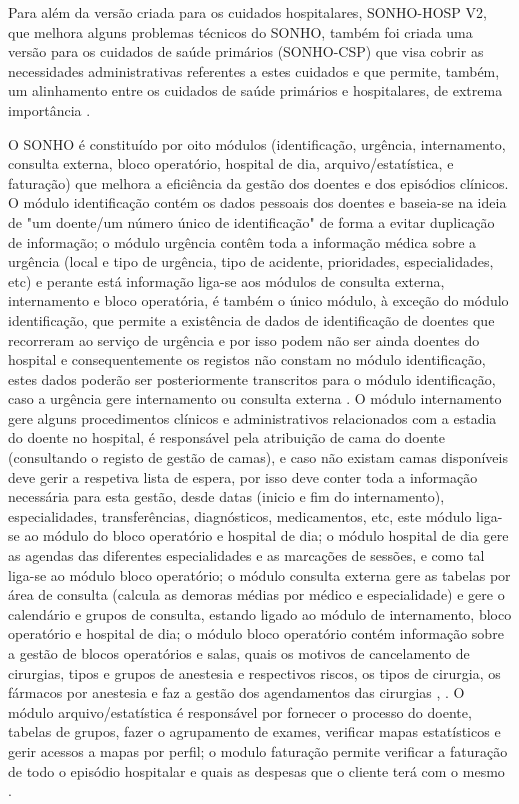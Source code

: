 \documentclass[conference]{IEEEtran}
\begin{document}
Para além da versão criada para os cuidados hospitalares, SONHO-HOSP V2, que melhora alguns problemas técnicos do SONHO, também foi criada uma versão para os cuidados de saúde primários (SONHO-CSP) que visa cobrir as necessidades administrativas referentes a estes cuidados e que permite, também, um alinhamento entre os cuidados de saúde primários e hospitalares, de extrema importância \cite{sonho}.

O SONHO é constituído por oito módulos (identificação, urgência, internamento, consulta externa, bloco operatório, hospital de dia, arquivo/estatística, e faturação) que melhora a eficiência da gestão dos doentes e dos episódios clínicos. O módulo identificação contém os dados pessoais dos doentes e baseia-se na ideia de "um doente/um número único de identificação" de forma a evitar duplicação de informação; o módulo urgência contêm toda a informação médica sobre a urgência (local e tipo de urgência, tipo de acidente, prioridades, especialidades, etc) e perante está informação liga-se aos módulos de consulta externa, internamento e bloco operatória, é também o único módulo, à exceção do módulo identificação, que permite a existência de dados de identificação de doentes que recorreram ao serviço de urgência e por isso podem não ser ainda doentes do hospital e consequentemente os registos não constam no módulo identificação, estes dados poderão ser posteriormente transcritos para o módulo identificação, caso a urgência gere internamento ou consulta externa \cite{sonho}. O módulo internamento gere alguns procedimentos clínicos e administrativos relacionados com a estadia do doente no hospital, é responsável pela atribuição de cama do doente (consultando o registo de gestão de camas), e caso não existam camas disponíveis deve gerir a respetiva lista de espera, por isso deve conter toda a informação necessária para esta gestão, desde datas (inicio e fim do internamento), especialidades, transferências, diagnósticos, medicamentos, etc, este módulo liga-se ao módulo do bloco operatório e hospital de dia; o módulo hospital de dia gere as agendas das diferentes especialidades e as marcações de sessões, e como tal liga-se ao módulo bloco operatório; o módulo consulta externa gere as tabelas por área de consulta (calcula as demoras médias por médico e especialidade) e gere o calendário e grupos de consulta, estando ligado ao módulo de internamento, bloco operatório e hospital de dia; o módulo bloco operatório contém  informação sobre a gestão de blocos operatórios e salas, quais os motivos de cancelamento de cirurgias,  tipos e grupos de anestesia e respectivos riscos, os tipos de cirurgia, os fármacos por anestesia e faz a gestão dos agendamentos das cirurgias \cite{sonho2013}, \cite{sonho}. O módulo arquivo/estatística é responsável por fornecer o processo do doente, tabelas de grupos, fazer o agrupamento de exames, verificar mapas estatísticos e gerir acessos a mapas por perfil; o modulo faturação permite verificar a faturação de todo o episódio hospitalar e quais as despesas que o cliente terá com o mesmo \cite{sonho}.
\end{document}
